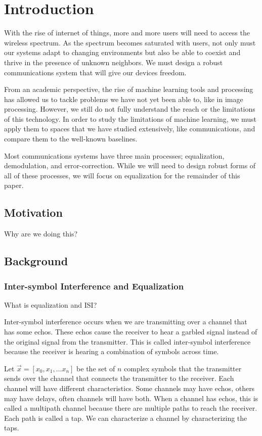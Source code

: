 \chapter{Introduction}

With the rise of internet of things, more and more users will need to access the wireless spectrum.  As the spectrum becomes saturated with users, not only must our systems adapt to changing environments but also be able to coexist and thrive in the presence of unknown neighbors.  
We must design a robust communications system that will give our devices freedom.

From an academic perspective, the rise of machine learning tools and processing has allowed us to tackle problems we have not yet been able to, like in image processing.  However, we still do not fully understand the reach or the limitations of this technology.  In order to study the limitations of machine learning, we must apply them to spaces that we have studied extensively, like communications, and compare them to the well-known baselines.

Most communications systems have three main processes; equalization, demodulation, and error-correction.  While we will need to design robust forms of all of these processes, we will focus on equalization for the remainder of this paper. 

\section{Motivation}
Why are we doing this?

\section{Background}

\subsection{Inter-symbol Interference and Equalization}

What is equalization and ISI? 

Inter-symbol interference occurs when we are transmitting over a channel that has some echos.  These echos cause the receiver to hear a garbled signal instead of the original signal from the transmitter.  This is called inter-symbol interference because the receiver is hearing a combination of symbols across time. 

Let $\vec{x}=[x_0, x_1, \ldots x_n]$ be the set of $n$ complex symbols that the transmitter sends over the channel that connects the transmitter to the receiver.
Each channel will have different characteristics. Some channels may have echos, others may have delays, often channels will have both.  When a channel has echos, this is called a multipath channel because there are multiple paths to reach the receiver.  Each path is called a tap.  We can characterize a channel by characterizing the taps.


